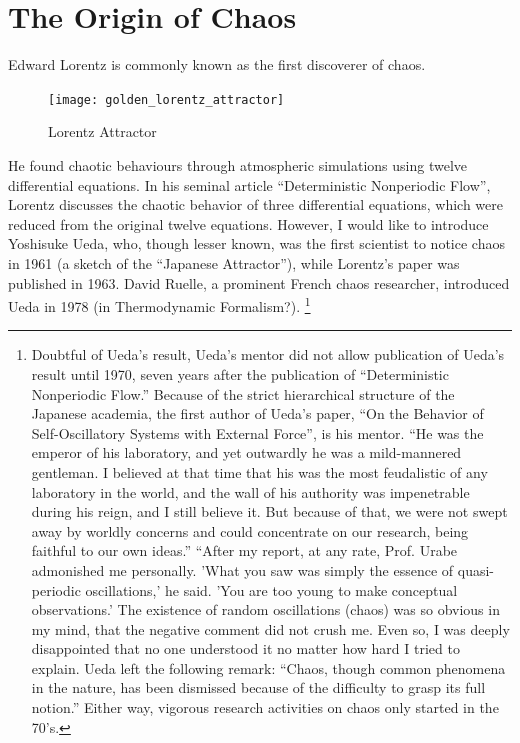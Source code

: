 \documentclass[12pt,twoside]{book}
\begin{document}
\section{The Origin of Chaos}
Edward Lorentz is commonly known as the first discoverer of chaos.
\begin{figure}[t]
  \begin{center}
    \texttt{[image: golden\_lorentz\_attractor]}
  \end{center}
  \caption{Lorentz Attractor}
  \label{fig:lorentz}
\end{figure}
He found chaotic behaviours through atmospheric simulations using twelve differential equations.
In his seminal article ``Deterministic Nonperiodic Flow'', Lorentz discusses the chaotic behavior of three differential equations, which were reduced from the original twelve equations.
However, I would like to introduce Yoshisuke Ueda, who, though lesser known, was the first scientist to notice chaos in 1961 (a sketch of the ``Japanese Attractor''), while Lorentz's paper was published in 1963.
David Ruelle, a prominent French chaos researcher, introduced Ueda in 1978 (in Thermodynamic Formalism?).
\footnote{Doubtful of Ueda's result, Ueda's mentor did not allow publication of Ueda's result until 1970, seven years after the publication of ``Deterministic Nonperiodic Flow.''
Because of the strict hierarchical structure of the Japanese academia, the first author of Ueda's paper, ``On the Behavior of Self-Oscillatory Systems with External Force'', is his mentor.%
``He was the emperor of his laboratory, and yet outwardly he was a mild-mannered gentleman.
I believed at that time that his was the most feudalistic of any laboratory in the world, and the wall of his authority was impenetrable during his reign, and I still believe it.
But because of that, we were not swept away by worldly concerns and could concentrate on our research, being faithful to our own ideas.''
``After my report, at any rate, Prof. Urabe admonished me personally.
'What you saw was simply the essence of quasi-periodic oscillations,' he said.
'You are too young to make conceptual observations.'
The existence of random oscillations (chaos) was so obvious in my mind, that the negative comment did not crush me.
Even so, I was deeply disappointed that no one understood it no matter how hard I tried to explain.\citep[p47]{ueda-abraham}
Ueda left the following remark: ``Chaos, though common phenomena in the nature, has been dismissed because of the difficulty to grasp its full notion.''\citep[p533]{gleick}
Either way, vigorous research activities on chaos only started in the 70's.}
\end{document}

